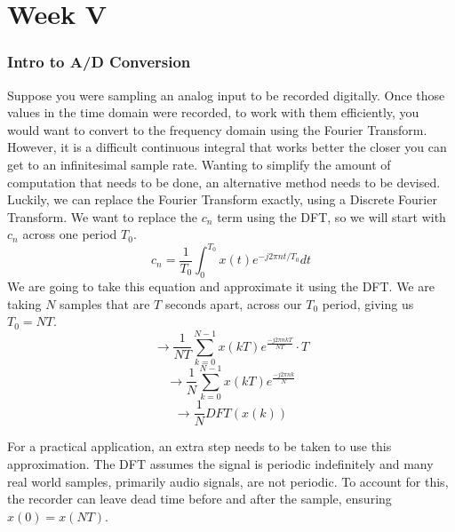 \documentclass[12pt]{article}
\newcommand{\partcontent}{}
\begin{document}
\noindent\makebox[\linewidth]{\rule{\paperwidth}{0.4pt}}

\part*{Week V}
\renewcommand\partcontent{Week V}
\section{Intro to A/D Conversion}
Suppose you were sampling an analog input to be recorded digitally. Once those values in the time domain were recorded, to work with them efficiently, you would want to convert to the frequency domain using the Fourier Transform. However, it is a difficult continuous integral that works better the closer you can get to an infinitesimal sample rate. Wanting to simplify the amount of computation that needs to be done, an alternative method needs to be devised. Luckily, we can replace the Fourier Transform exactly, using a Discrete Fourier Transform. We want to replace the $c_n$ term using the DFT, so we will start with $c_n$ across one period $T_0$. $$c_n = \frac{1}{T_0} \int_{0}^{T_0} x(t)e^{-j2\pi nt/T_0} dt $$ We are going to take this equation and approximate it using the DFT. We are taking $N$ samples that are $T$ seconds apart, across our $T_0$ period, giving us $T_0 = NT$. $$\rightarrow \frac{1}{NT} \sum_{k=0}^{N-1} x(kT)e^{\frac{-j2\pi nkT}{NT}} \cdot T $$
$$\rightarrow \frac{1}{N} \sum_{k=0}^{N-1} x(kT)e^{\frac{-j2\pi nk}{N}}$$ 
$$\rightarrow \frac{1}{N} DFT(x(k))$$

For a practical application, an extra step needs to be taken to use this approximation. The DFT assumes the signal is periodic indefinitely and many real world samples, primarily audio signals, are not periodic. To account for this, the recorder can leave dead time before and after the sample, ensuring $x(0) = x(NT)$.
\end{document}
